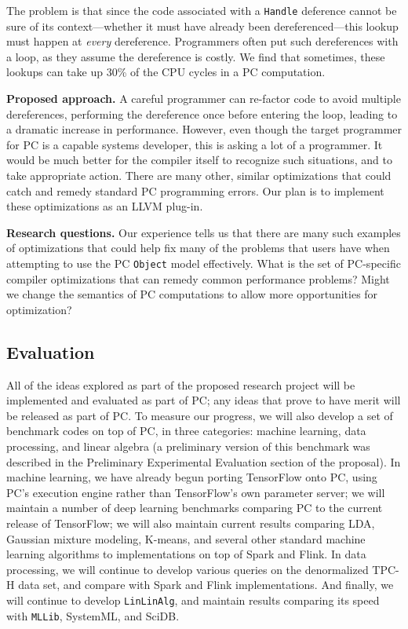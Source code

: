 The problem is that since the code associated with a \texttt{Handle} deference cannot be sure of its context---whether it must
have already been dereferenced---this lookup must happen at \emph{every} dereference.  Programmers often put such dereferences
with a loop, as they assume the dereference is costly. We find that sometimes, these lookups
can take up 30\% of the CPU cycles in a PC computation.

\vspace{5 pt} 
\noindent
\textbf{Proposed approach.}
A careful programmer can re-factor code to avoid multiple dereferences, performing the dereference once before entering the loop,
leading to a dramatic increase in performance.  However, even though the target programmer for PC is a capable systems developer,
this
is asking a lot of a programmer.  It would be much better for the compiler itself to recognize such situations, and to take
appropriate action.  There are many other, similar optimizations that could catch and remedy standard PC programming errors.
Our plan is to implement these optimizations as an LLVM plug-in.

\vspace{5 pt}
\noindent
\textbf{Research questions.} Our experience tells us that there are many such examples of optimizations that could help fix many
of the problems that users have when attempting to use the PC \texttt{Object} model effectively.
What is the set of PC-specific compiler optimizations that can remedy common performance problems?
Might we change the semantics of PC computations to allow more opportunities for optimization?

\subsection{Evaluation}

All of the ideas explored as part of the proposed research project will be implemented and evaluated as part of PC; any
ideas that prove to have merit will be released as part of PC. To
measure our progress,
we will also develop a set of benchmark codes on top of PC, in three categories: machine learning,
data processing, and linear algebra (a preliminary version of this benchmark was described in the Preliminary Experimental Evaluation
section of the proposal).  In machine learning, we have already begun porting TensorFlow \cite{abadi2016tensorflow} onto PC, using PC's execution engine
rather than TensorFlow's own parameter server; we will maintain a number of deep learning benchmarks comparing PC to the current
release of TensorFlow; we will also maintain current
results comparing LDA, Gaussian mixture modeling, K-means, and several other standard
machine learning algorithms to implementations on top of Spark and Flink.  In data processing, we will continue to develop
various queries on the denormalized TPC-H data set, and compare with Spark and Flink implementations.  And finally, we will
continue to develop \texttt{LinLinAlg}, and maintain results comparing its speed with \texttt{MLLib}, SystemML, and SciDB.


